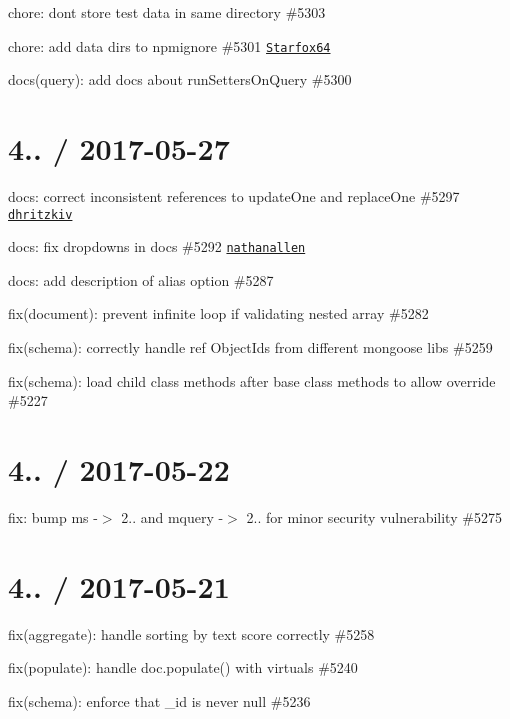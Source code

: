 \begin{DoxyItemize}
\item chore\+: dont store test data in same directory \#5303
\item chore\+: add data dirs to npmignore \#5301 \href{https://github.com/Starfox64}{\tt Starfox64}
\item docs(query)\+: add docs about run\+Setters\+On\+Query \#5300
\end{DoxyItemize}

\section*{4.. / 2017-\/05-\/27 }


\begin{DoxyItemize}
\item docs\+: correct inconsistent references to update\+One and replace\+One \#5297 \href{https://github.com/dhritzkiv}{\tt dhritzkiv}
\item docs\+: fix dropdowns in docs \#5292 \href{https://github.com/nathanallen}{\tt nathanallen}
\item docs\+: add description of alias option \#5287
\item fix(document)\+: prevent infinite loop if validating nested array \#5282
\item fix(schema)\+: correctly handle ref Object\+Ids from different mongoose libs \#5259
\item fix(schema)\+: load child class methods after base class methods to allow override \#5227
\end{DoxyItemize}

\section*{4.. / 2017-\/05-\/22 }


\begin{DoxyItemize}
\item fix\+: bump ms -\/$>$ 2.. and mquery -\/$>$ 2.. for minor security vulnerability \#5275
\end{DoxyItemize}

\section*{4.. / 2017-\/05-\/21 }


\begin{DoxyItemize}
\item fix(aggregate)\+: handle sorting by text score correctly \#5258
\item fix(populate)\+: handle doc.\+populate() with virtuals \#5240
\item fix(schema)\+: enforce that {\ttfamily \+\_\+id} is never null \#5236
\end{DoxyItemize}

